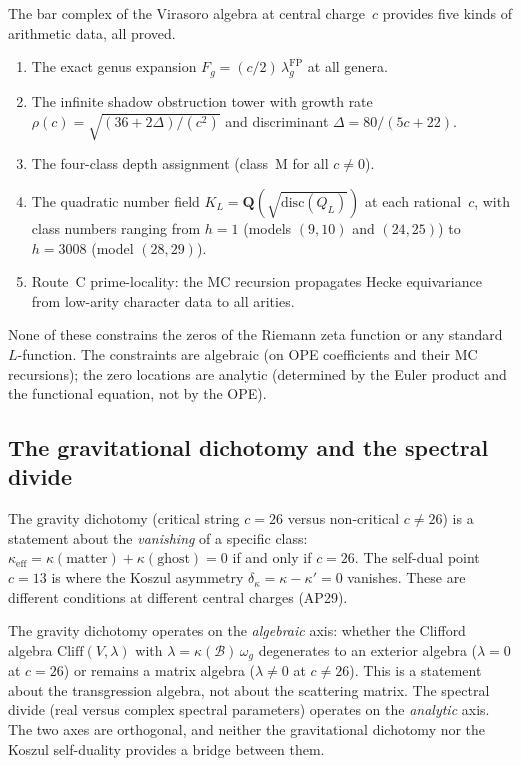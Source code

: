 \documentclass[11pt]{article}
\newcommand{\cB}{\mathcal{B}}
\begin{document}
The bar complex of the Virasoro algebra at central charge~$c$
provides five kinds of arithmetic data, all proved.

\begin{enumerate}
\item The exact genus expansion
$F_g = (c/2)\,\lambda_g^{\mathrm{FP}}$ at all genera.
\item The infinite shadow obstruction tower with growth rate
$\rho(c) = \sqrt{(36 + 2\Delta)/(c^2)}$ and discriminant
$\Delta = 80/(5c{+}22)$.
\item The four-class depth assignment (class~M for all
$c \neq 0$).
\item The quadratic number field
$K_L = \mathbf{Q}(\sqrt{\mathrm{disc}(Q_L)})$ at each
rational~$c$, with class numbers ranging from $h = 1$
(models $(9,10)$ and $(24,25)$) to $h = 3008$ (model $(28,29)$).
\item Route~C prime-locality: the MC recursion propagates
Hecke equivariance from low-arity character data to all
arities.
\end{enumerate}

None of these constrains the zeros of the Riemann zeta function
or any standard $L$-function.  The constraints are algebraic
(on OPE coefficients and their MC recursions); the zero
locations are analytic (determined by the Euler product and the
functional equation, not by the OPE).

\subsection{The gravitational dichotomy and the spectral divide}

The gravity dichotomy (critical string $c = 26$ versus
non-critical $c \neq 26$) is a statement about the
\emph{vanishing} of a specific class:
$\kappa_{\mathrm{eff}} = \kappa(\mathrm{matter})
+ \kappa(\mathrm{ghost}) = 0$ if and only if $c = 26$.
The self-dual point $c = 13$ is where the Koszul asymmetry
$\delta_\kappa = \kappa - \kappa' = 0$ vanishes.  These are
different conditions at different central charges (AP29).

The gravity dichotomy operates on the \emph{algebraic} axis:
whether the Clifford algebra $\mathrm{Cliff}(V, \lambda)$
with $\lambda = \kappa(\cB)\,\omega_g$ degenerates to an
exterior algebra ($\lambda = 0$ at $c = 26$) or remains a
matrix algebra ($\lambda \neq 0$ at $c \neq 26$).  This is a
statement about the transgression algebra, not about the
scattering matrix.  The spectral divide (real versus complex
spectral parameters) operates on the \emph{analytic} axis.
The two axes are orthogonal, and neither the gravitational
dichotomy nor the Koszul self-duality provides a bridge between
them.
\end{document}
